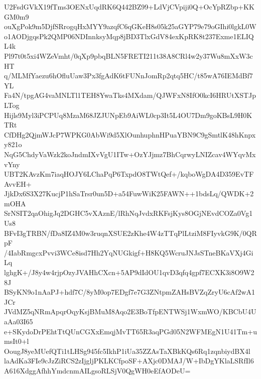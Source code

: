 U2FsdGVkX19fTms3OENxUqdRK6Q442BZ99+LdVjCVpiji0Q+OcYpRZbp+KKGM0m9
ouXgPok9m5DjfSRrogqHxMYY9azqfC6qGKeH8s05k25aGYP79e79oGIhi0lgkL0W
o1AODjgqsPk2QMP06NDInnksyMqp8jBD3TlxGdV84exKpRK8t237Exme1ELIQL4k
Pl97t0t5xi4WZeVmht/0qXp9pbqBLN5FRETI211t38A8CRl4w2y37Wu8mXxW3cHT
q/MLMfYaezu6hOfluUaw3Px3fgAdK6tFUNnJomRp2qtq5HC/t85wA76IEMdBf7YL
Fa4N/tpgAG4vaMNLTl1TEH8YwaTks4MXdam/QJWFxN8IfO0kcI6HRUtXSTJpLTog
Hijls9Myl3iPCPUq8MzaM68JZJUNpEb9AiWL0cp3It5L4OU7Dm9goKBsL9H0KTRt
CfDHg2QjmWJcP7WPKG0AbWi9d5XlOunhuphnHPuaYBN9C9gSmtlK48hKnpxy821o
NqG5ChdyVaWzk2koJndmIXvVgU1ITw+OzYJjmz7BhCqrwyLNIZcav4WYqvMxvYny
UBT2KAvzKm7iaqHOJY6LChaPqP6TxpdO8TWtQef+/kqboWgDA4D359EvTFAvvEH+
JjkDx6S3X27KucjP1hSaTrsr0un5D+a54FuwWiK25FAWN++1bdsLq/QWDK+2mOHA
SrNSIT2qaOhigJq2DGHC5vXAznE/lRhNqJvdxRKFsjKys8OGjNEvdCOZa0Vg1Us8
BFvI3gTRBN/fDa8IZ4M0w3ruqnXSUE2zKhe4W4zTTqPlLtziM8FIyvkG9K/0QRpF
/4IabRmgcxPvvi3WCe8isd7Hh2YqNUGkigf+H8KQ5WcruJNJsSTneBKaVXj4GiLq
lghgK+/J8y4w4rjpOzyJVAHhCXcn+5AP9dIdOU1qvD3qfq4gpf7ECXK3i8O9W28J
BSyKN9o1nAaPJ+hdf7C/8yM0op7EDgf7e7G3ZNtpmZAHsBVZqZryU6cAf2wA1JCr
JVdMZ5qNRmApqrOqyKsjBMuM8Aqo2E3BoTfpENTWSj1WxmWO/KBCbU4UaAa03I65
e+SKydoDrPEhtTtQUnCGXxEmqjMvTT65R3aqPGd05N2WFMEgN1U41Tm+umsIt0+l
OougJ8yeMUefQTi1tLHSg945fc5IkhP1iUa35ZZAsTaXBkKQs6Rq1zqnbiydBX4l
laAdKa3FIe9cJzZiRCS2zIjgljPKLKCfpoSF+AXjc0DMAJ/W+IbDgYKlaLSRfIl6
A616XdggAfhhYmdcnmAILgsoRLSjV0QgWH0eEfAODeU=
